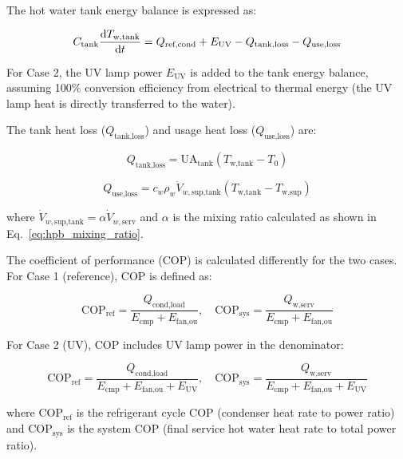 \documentclass[letterpaper,10pt]{article}
\begin{document}
The hot water tank energy balance is expressed as:

\begin{equation}
\label{eq:hpb_tank_energy}
C_{\text{tank}} \frac{{\rm d}T_{\text{w,tank}}}{{\rm d}t} = Q_{\text{ref,cond}} + E_{\text{UV}} - Q_{\text{tank,loss}} - Q_{\text{use,loss}}
\end{equation}

For Case 2, the UV lamp power $E_{\text{UV}}$ is added to the tank energy balance, assuming 100\% conversion efficiency from electrical to thermal energy (the UV lamp heat is directly transferred to the water).

The tank heat loss ($Q_{\text{tank,loss}}$) and usage heat loss ($Q_{\text{use,loss}}$) are:

\begin{equation}
\label{eq:hpb_q_tank_loss}
Q_{\text{tank,loss}} = \text{UA}_{\text{tank}} (T_{\text{w,tank}} - T_0)
\end{equation}

\begin{equation}
\label{eq:hpb_q_use_loss}
Q_{\text{use,loss}} = c_w \rho_w \dot{V}_{w,\text{sup,tank}} (T_{\text{w,tank}} - T_{\text{w,sup}})
\end{equation}

where $\dot{V}_{w,\text{sup,tank}} = \alpha \dot{V}_{w,\text{serv}}$ and $\alpha$ is the mixing ratio calculated as shown in Eq.~\eqref{eq:hpb_mixing_ratio}.

The coefficient of performance (COP) is calculated differently for the two cases. For Case 1 (reference), COP is defined as:

\begin{equation}
\label{eq:cop_ref_case1}
\text{COP}_{\text{ref}} = \frac{Q_{\text{cond,load}}}{E_{\text{cmp}} + E_{\text{fan,ou}}}, \quad \text{COP}_{\text{sys}} = \frac{Q_{\text{w,serv}}}{E_{\text{cmp}} + E_{\text{fan,ou}}}
\end{equation}

For Case 2 (UV), COP includes UV lamp power in the denominator:

\begin{equation}
\label{eq:cop_ref_case2}
\text{COP}_{\text{ref}} = \frac{Q_{\text{cond,load}}}{E_{\text{cmp}} + E_{\text{fan,ou}} + E_{\text{UV}}}, \quad \text{COP}_{\text{sys}} = \frac{Q_{\text{w,serv}}}{E_{\text{cmp}} + E_{\text{fan,ou}} + E_{\text{UV}}}
\end{equation}

where $\text{COP}_{\text{ref}}$ is the refrigerant cycle COP (condenser heat rate to power ratio) and $\text{COP}_{\text{sys}}$ is the system COP (final service hot water heat rate to total power ratio).
\end{document}
